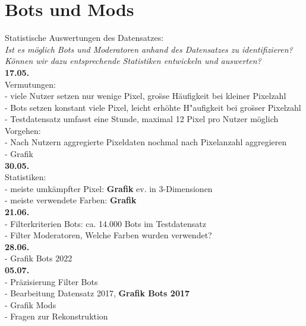 \section{Bots und Mods} \label{question2} %

Statistische Auswertungen des Datensatzes:\\
\textit{Ist es m{\"o}glich Bots und Moderatoren anhand des Datensatzes zu identifizieren?}\\
\textit{K{\"o}nnen wir dazu entsprechende Statistiken entwickeln und auswerten?}\\
\textbf{17.05.}\\
Vermutungen:\\
- viele Nutzer setzen nur wenige Pixel, gro{\"ss}e H{\"a}ufigkeit bei kleiner Pixelzahl\\
- Bots setzen konstant viele Pixel, leicht erh{\"o}hte H{{"a}ufigkeit bei gro{\"ss}er Pixelzahl\\
- Testdatensatz umfasst eine Stunde, maximal 12 Pixel pro Nutzer m{\"o}glich\\
Vorgehen:\\
- Nach Nutzern aggregierte Pixeldaten nochmal nach Pixelanzahl aggregieren\\
- Grafik \\
\textbf{30.05.}\\
Statistiken:\\
- meiste umk{\"a}mpfter Pixel: \textbf{Grafik} ev. in 3-Dimensionen\\
- meiste verwendete Farben: \textbf{Grafik}\\
\textbf{21.06.}\\
- Filterkriterien Bots: ca. 14.000 Bots im Testdatensatz\\
- Filter Moderatoren,  Welche Farben wurden verwendet?\\
\textbf{28.06.}\\
- Grafik Bots 2022\\
\textbf{05.07.}\\
- Pr{\"a}zisierung Filter Bots\\
- Bearbeitung Datensatz 2017, \textbf{Grafik Bots 2017}\\
- Grafik Mods\\
- Fragen zur Rekonstruktion\\

}
